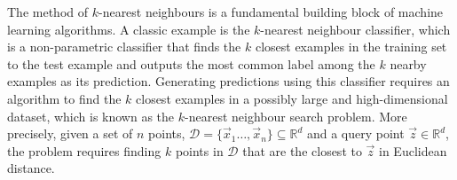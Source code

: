 \documentclass[preview]{standalone}
\begin{document}

The method of $k$-nearest neighbours is a fundamental building block of machine learning algorithms. A classic example is the $k$-nearest
neighbour classifier, which is a non-parametric classifier that finds the $k$ closest examples in the training set to the test example and outputs the most common label among the $k$ nearby examples as its prediction. Generating predictions using this classifier requires an algorithm to find the $k$ closest examples in a possibly large and high-dimensional dataset, which is known as the $k$-nearest neighbour search problem. More precisely, given a set of $n$ points, $\mathcal{D}=\{\vec{x}_{1}\ldots,\vec{x}_{n}\}\subseteq\mathbb{R}^{d}$ and a query point $\vec{z}\in\mathbb{R}^{d}$, the problem requires finding $k$ points in $\mathcal{D}$ that are the closest to $\vec{z}$ in Euclidean distance.
\end{document}

